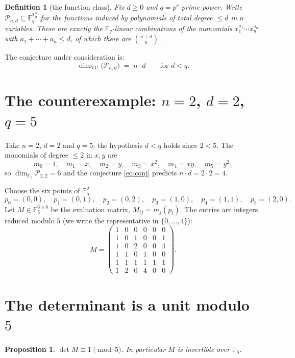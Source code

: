 \documentclass[11pt]{article}
\newtheorem{proposition}[theorem]{Proposition}
\newtheorem{definition}[theorem]{Definition}
\newcommand{\F}{\mathbb{F}}
\begin{document}
\begin{definition}[the function class]
Fix $d\ge 0$ and $q=p^{r}$ prime power. Write
$\mathcal{P}_{n,d}\subseteq\F_q^{\F_q^n}$ for the functions induced by
polynomials of total degree $\le d$ in $n$ variables. These are exactly the
$\F_q$-linear combinations of the monomials
$x_1^{a_1}\cdots x_n^{a_n}$ with $a_1+\cdots+a_n\le d$, of which there are
$\binom{n+d}{n}$.
\end{definition}

The conjecture under consideration is:
\begin{equation}\label{eq:conj}
  \dim_{\mathrm{VC}}\bigl(\mathcal{P}_{n,d}\bigr) \;=\; n\cdot d
  \qquad\text{for } d<q .
\end{equation}

\section{The counterexample: $n=2$, $d=2$, $q=5$}

Take $n=2$, $d=2$ and $q=5$; the hypothesis $d<q$ holds since $2<5$. The
monomials of degree $\le 2$ in $x,y$ are
\[
  m_0=1,\quad m_1=x,\quad m_2=y,\quad m_3=x^2,\quad m_4=xy,\quad m_5=y^2 ,
\]
so $\dim_{\F_5}\mathcal{P}_{2,2}=6$ and the conjecture \eqref{eq:conj} predicts
$n\cdot d=2\cdot 2=4$.

Choose the six points of $\F_5^2$
\[
  p_0=(0,0),\quad p_1=(0,1),\quad p_2=(0,2),\quad
  p_3=(1,0),\quad p_4=(1,1),\quad p_5=(2,0).
\]
Let $M\in\F_5^{6\times 6}$ be the evaluation matrix, $M_{ij}=m_j(p_i)$. The
entries are integers reduced modulo $5$ (we write the representative in
$\{0,\dots,4\}$):
\begin{equation}\label{eq:M}
  M=\begin{pmatrix}
    1&0&0&0&0&0\\
    1&0&1&0&0&1\\
    1&0&2&0&0&4\\
    1&1&0&1&0&0\\
    1&1&1&1&1&1\\
    1&2&0&4&0&0
  \end{pmatrix}.
\end{equation}

\section{The determinant is a unit modulo $5$}

\begin{proposition}\label{prop:det}
  $\det M \equiv 1 \pmod 5$. In particular $M$ is invertible over $\F_5$.
\end{proposition}
\end{document}

